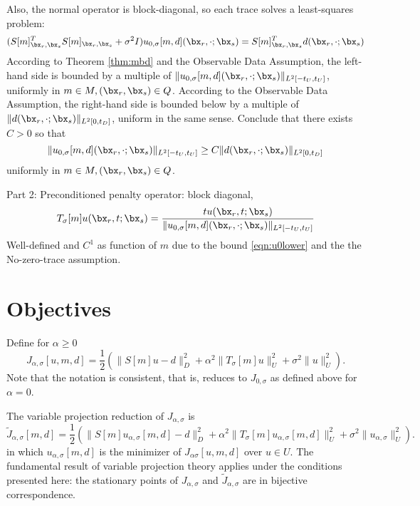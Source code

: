 Also, the normal operator is block-diagonal, so each trace solves a least-squares problem:
\begin{equation}
  \label{eqn:blocknormal}
  (S[m]_{\bx_r,\bx_s}^TS[m]_{\bx_r,\bx_s} + \sigma^2 I)u_{0,\sigma}[m,d](\bx_r,\cdot; \bx_s)= S[m]_{\bx_r,\bx_s}^Td(\bx_r,\cdot;\bx_s)
\end{equation}
According to Theorem \ref{thm:mbd} and the Observable Data Assumption, the left-hand side is bounded by a multiple of $\|u_{0,\sigma}[m,d](\bx_r,\cdot; \bx_s)\|_{L^2[-t_U,t_U]}$, uniformly in $m \in M, (\bx_r,\bx_s) \in Q$. According to the Observable Data Assumption, the right-hand side is bounded below by a multiple of $\|d(\bx_r,\cdot;\bx_s)\|_{L^2[0,t_D]}$, uniform in the same sense. Conclude that there exists $C>0$ so that
\begin{equation}
  \label{eqn:u0lower}
  \|u_{0,\sigma}[m,d](\bx_r,\cdot; \bx_s)\|_{L^2[-t_U,t_U]} \ge C \|d(\bx_r,\cdot;\bx_s)\|_{L^2[0,t_D]}
\end{equation}
uniformly in $m \in M, (\bx_r,\bx_s) \in Q$.

Part 2:
Preconditioned penalty operator: block diagonal, 
\begin{equation}
  \label{eqn:ppf}
  T_{\sigma}[m]u (\bx_r,t;\bx_s) = \frac{t u(\bx_r,t;\bx_s)}{\|u_{0,\sigma}[m,d](\bx_r,\cdot; \bx_s)\|_{L^2[-t_U,t_U]} }
\end{equation}
Well-defined and $C^1$ as function of $m$ due to the bound \ref{eqn:u0lower} and the the No-zero-trace assumption.

\section{Objectives}
Define for $\alpha \ge 0$
\[
 J_{\alpha,\sigma}[u,m,d] = \frac{1}{2}(\|S[m]u - d\|_D^2 + \alpha^2\|T_\sigma[m]u\|_U^2 + \sigma^2 \|u\|^2_U).
\]
Note that the notation is consistent, that is, reduces to $J_{0,\sigma}$ as defined above for $\alpha=0$.

The variable projection reduction of $J_{\alpha,\sigma}$ is
\begin{equation}
  \label{eqn:jtilde}
 \tilde{J}_{\alpha,\sigma}[m,d] = \frac{1}{2}(\|S[m]u_{\alpha,\sigma}[m,d] - d\|_D^2 + \alpha^2\|T_\sigma[m]u_{\alpha,\sigma}[m,d]\|_U^2 + \sigma^2 \|u_{\alpha,\sigma}\|^2_U).
\end{equation}
in which $u_{\alpha,\sigma}[m,d]$ is the minimizer of $J_{\alpha\sigma}[u,m,d]$ over $u \in U$. The fundamental result of variable projection theory \cite[]{GolubPeyreyra:73} applies under the conditions presented here: the stationary points of $J_{\alpha,\sigma}$ and $\tilde{J}_{\alpha,\sigma}$ are in bijective correspondence.

